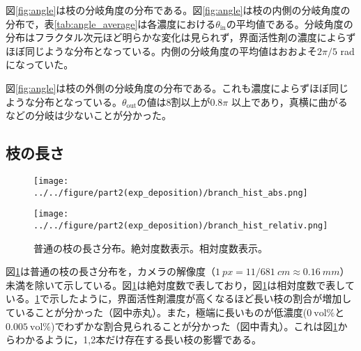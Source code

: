 \documentclass[autodetect-engine,dvi=dvipdfmx,a4paper,ja=standard,oneside,openany,11pt]{bxjsbook}
\begin{document}
図\ref{fig:angle}は枝の分岐角度の分布である。図\ref{fig:angle}は枝の内側の分岐角度の分布で，表\ref{tab:angle_average}は各濃度における$\theta_{\mathrm{in}}$の平均値である。分岐角度の分布はフラクタル次元ほど明らかな変化は見られず，界面活性剤の濃度によらずほぼ同じような分布となっている。内側の分岐角度の平均値はおおよそ$2\pi/5$ radになっていた。

図\ref{fig:angle}は枝の外側の分岐角度の分布である。これも濃度によらずほぼ同じような分布となっている。$\theta_{\mathrm{out}}$の値は8割以上が$0.8\pi$ 以上であり，真横に曲がるなどの分岐は少ないことが分かった。
\subsection{枝の長さ}

\begin{figure}[htbp]
  \begin{minipage}
    {0.45\textwidth}
    \subcaption{}
    \centering
    \texttt{[image: ../../figure/part2(exp\_deposition)/branch\_hist\_abs.png]}
    \label{fig:branch_length_absolute}
  \end{minipage}
  \begin{minipage}
    {0.45\textwidth}
    \subcaption{}
    \centering
    \texttt{[image: ../../figure/part2(exp\_deposition)/branch\_hist\_relativ.png]}
    \label{fig:branch_length_relativ}
  \end{minipage}
  \caption{普通の枝の長さ分布。絶対度数表示。相対度数表示。}
  \label{fig:branch_length}
\end{figure}

図\ref{fig:branch_length}は普通の枝の長さ分布を，カメラの解像度（$\SI{1}{px}=11/\SI{681}{cm}\approx \SI{0.16}{mm}$）未満を除いて示している。図\ref{fig:branch_length}は絶対度数で表しており，図\ref{fig:branch_length}は相対度数で表している。\ref{fig:branch_length}で示したように，界面活性剤濃度が高くなるほど長い枝の割合が増加していることが分かった（図中赤丸）。また，極端に長いものが低濃度($\SI{0}{\mathrm{vol}\%}$と$\SI{0.005}{\mathrm{vol}\%}$)でわずかな割合見られることが分かった（図中青丸）。これは図\ref{fig:branch_length}からわかるように，1,2本だけ存在する長い枝の影響である。
\end{document}
